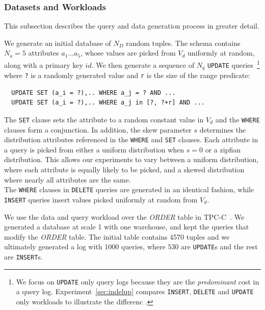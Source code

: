 \subsubsection{Datasets and Workloads}

This subsection describes the query and data generation process in greater detail.

 \label{sec:syntheticgen}
We generate an initial database of $N_D$ random tuples.  
The schema contains $N_a=5$ attributes $a_1\ldots a_5$, whose values are
picked from $V_d$ uniformly at random, along with a primary key $id$.
We then generate a sequence of $N_q$ \texttt{UPDATE} queries~\footnote{\scriptsize We focus on
\texttt{UPDATE} only query logs because they are the {\it predominant} cost 
in a query log.  Experiment~\ref{sec:indelup} compares \texttt{INSERT}, \texttt{DELETE} and \texttt{UPDATE}
only workloads to illustrate the differenc .} where 
\verb|?| is a randomly generated value and \verb|r| is the size of the range predicate: 
{\scriptsize
\begin{verbatim}
  UPDATE SET (a_i = ?),.. WHERE a_j = ? AND ...
  UPDATE SET (a_i = ?),.. WHERE a_j in [?, ?+r] AND ...
\end{verbatim}
}

The \texttt{SET} clause sets the attribute to a random constant value in $V_d$ and 
the \texttt{WHERE} clauses form a conjunction.  
In addition, the skew parameter $s$ determines the distribution attributes referenced in the \texttt{WHERE} and \texttt{SET} clauses.  
Each attribute in a query is picked from either a uniform distribution when $s=0$ or a zipfian~\cite{zipf} distribution.
This allows our experiments to vary between a uniform distribution, where each attribute is
equally likely to be picked, and a skewed distribution where nearly all attributes are the same. \\
The \texttt{WHERE} clauses in \texttt{DELETE} queries are generated in an identical fashion, while
\texttt{INSERT} queries insert values picked uniformly at random from $V_d$.



 We use the data and query workload over the {\it ORDER} table in TPC-C~\cite{tpcc}.  
We generated a database at scale 1 with one warehouse, and kept the queries that modify the
{\it ORDER} table. The initial table contains 4570 tuples and we ultimately generated a log with
1000 queries, where $530$ are \texttt{UPDATE}s and the rest are \texttt{INSERT}s.

